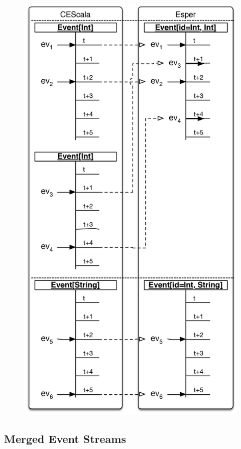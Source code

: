 \documentclass[book,type=bsc,colorback,accentcolor=tud8b,12pt,twoside]{tudthesis}
\begin{document}
\begin{figure}[tp]
\begin{minipage}{.5\textwidth}
  \centering
  \includegraphics[width=.96\linewidth]{Resources/Figures/merged_streams}
  \label{fig:merged-streams}
\end{minipage}
\end{figure}

\subsection{Merged Event Streams}
\label{sec:merged-event}
\end{document}
